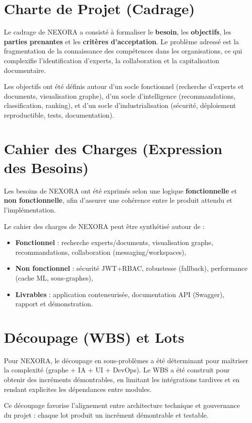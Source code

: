 \documentclass[12pt,a4paper]{report}
\begin{document}
\section{Charte de Projet (Cadrage)}
Le cadrage de NEXORA a consisté à formaliser le \textbf{besoin}, les \textbf{objectifs}, les \textbf{parties prenantes} et les \textbf{critères d'acceptation}. Le problème adressé est la fragmentation de la connaissance des compétences dans les organisations, ce qui complexifie l'identification d'experts, la collaboration et la capitalisation documentaire.

Les objectifs ont été définis autour d'un socle fonctionnel (recherche d'experts et documents, visualisation graphe), d'un socle d'intelligence (recommandations, classification, ranking), et d'un socle d'industrialisation (sécurité, déploiement reproductible, tests, documentation).

\section{Cahier des Charges (Expression des Besoins)}
Les besoins de NEXORA ont été exprimés selon une logique \textbf{fonctionnelle} et \textbf{non fonctionnelle}, afin d'assurer une cohérence entre le produit attendu et l'implémentation.

Le cahier des charges de NEXORA peut être synthétisé autour de :
\begin{itemize}
  \item \textbf{Fonctionnel} : recherche experts/documents, visualisation graphe, recommandations, collaboration (messaging/workspaces),
  \item \textbf{Non fonctionnel} : sécurité JWT+RBAC, robustesse (fallback), performance (cache ML, sous-graphes),
  \item \textbf{Livrables} : application conteneurisée, documentation API (Swagger), rapport et démonstration.
\end{itemize}

\section{Découpage (WBS) et Lots}
Pour NEXORA, le découpage en sous-problèmes a été déterminant pour maîtriser la complexité (graphe + IA + UI + DevOps). Le WBS a été construit pour obtenir des incréments démontrables, en limitant les intégrations tardives et en rendant explicites les dépendances entre modules.

Ce découpage favorise l'alignement entre architecture technique et gouvernance du projet : chaque lot produit un incrément démontrable et testable.
\end{document}

